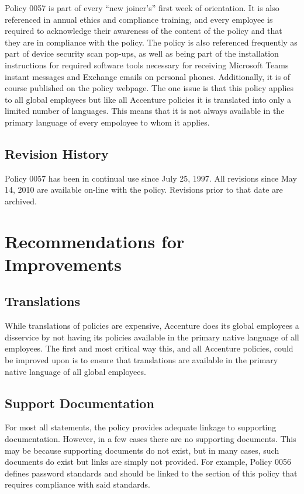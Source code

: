 \documentclass[stu]{apa7}
\begin{document}
Policy 0057 is part of every ``new joiner's'' first week of orientation. It is also referenced in annual ethics and compliance training, and every employee is required to acknowledge their awareness of the content of the policy and that they are in compliance with the policy. The policy is also referenced frequently as part of device security scan pop-ups, as well as being part of the installation instructions for required software tools necessary for receiving Microsoft Teams instant messages and Exchange emails on personal phones. Additionally, it is of course published on the policy webpage. The one issue is that this policy applies to all global employees but like all Accenture policies it is translated into only a limited number of languages. This means that it is not always available in the primary language of every empoloyee to whom it applies.

\subsection{Revision History}
\label{sec:org92aa927}

Policy 0057 has been in continual use since July 25, 1997. All revisions since May 14, 2010 are available on-line with the policy. Revisions prior to that date are archived.

\section{Recommendations for Improvements}
\label{sec:org06fdffe}

\subsection{Translations}
\label{sec:org7ee1b1a}

While translations of policies are expensive, Accenture does its global employees a disservice by not having its policies available in the primary native language of all employees. The first and most critical way this, and all Accenture policies, could be improved upon is to ensure that translations are available in the primary native language of all global employees.

\subsection{Support Documentation}
\label{sec:org5914025}

For most all statements, the policy provides adequate linkage to supporting documentation. However, in a few cases there are no supporting documents. This may be because supporting documents do not exist, but in many cases, such documents do exist but links are simply not provided. For example, Policy 0056 defines password standards and should be linked to the section of this policy that requires compliance with said standards.
\end{document}
